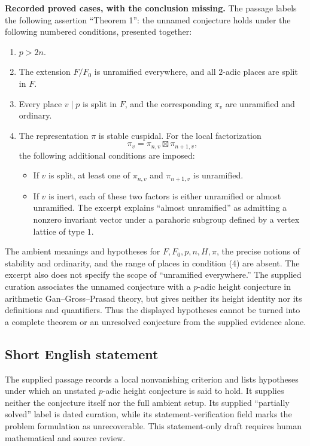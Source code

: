 \documentclass[11pt]{article}
\begin{document}
\textbf{Recorded proved cases, with the conclusion missing.} The passage labels the following assertion ``Theorem 1'': the unnamed conjecture holds under the following numbered conditions, presented together:
\begin{enumerate}
\item \(p>2n\).
\item The extension \(F/F_0\) is unramified everywhere, and all \(2\)-adic places are split in \(F\).
\item Every place \(v\mid p\) is split in \(F\), and the corresponding \(\pi_v\) are unramified and ordinary.
\item The representation \(\pi\) is stable cuspidal. For the local factorization
\[
\pi_v=\pi_{n,v}\boxtimes\pi_{n+1,v},
\]
the following additional conditions are imposed:
\begin{itemize}
\item If \(v\) is split, at least one of \(\pi_{n,v}\) and \(\pi_{n+1,v}\) is unramified.
\item If \(v\) is inert, each of these two factors is either unramified or almost unramified. The excerpt explains ``almost unramified'' as admitting a nonzero invariant vector under a parahoric subgroup defined by a vertex lattice of type \(1\).
\end{itemize}
\end{enumerate}
The ambient meanings and hypotheses for \(F,F_0,p,n,H,\pi\), the precise notions of stability and ordinarity, and the range of places in condition (4) are absent. The excerpt also does not specify the scope of ``unramified everywhere.'' The supplied curation associates the unnamed conjecture with a \(p\)-adic height conjecture in arithmetic Gan--Gross--Prasad theory, but gives neither its height identity nor its definitions and quantifiers. Thus the displayed hypotheses cannot be turned into a complete theorem or an unresolved conjecture from the supplied evidence alone.
\subsection{Short English statement}
The supplied passage records a local nonvanishing criterion and lists hypotheses under which an unstated \(p\)-adic height conjecture is said to hold. It supplies neither the conjecture itself nor the full ambient setup. Its supplied ``partially solved'' label is dated curation, while its statement-verification field marks the problem formulation as unrecoverable. This statement-only draft requires human mathematical and source review.
\end{document}
